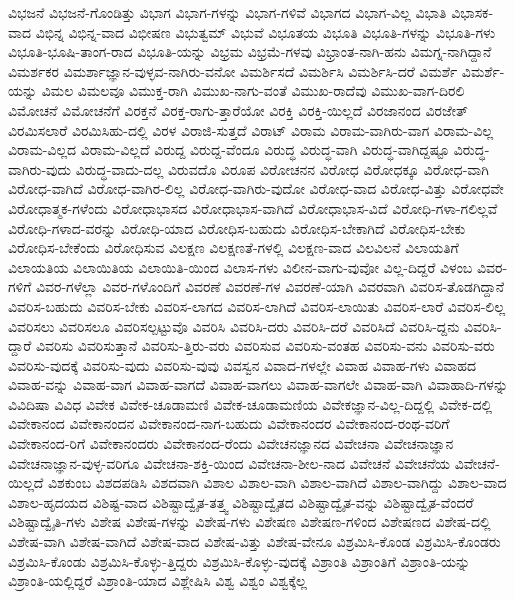 {ವಿಭಜನೆ
ವಿಭಜನೆ-ಗೊಂಡಿತ್ತು
ವಿಭಾಗ
ವಿಭಾಗ-ಗಳನ್ನು
ವಿಭಾಗ-ಗಳಿವೆ
ವಿಭಾಗದ
ವಿಭಾಗ-ವಿಲ್ಲ
ವಿಭಾತಿ
ವಿಭಾಸಕ-ವಾದ
ವಿಭಿನ್ನ
ವಿಭಿನ್ನ-ವಾದ
ವಿಭೀಷಣ
ವಿಭುತ್ವಮ್
ವಿಭುವೆ
ವಿಭೂತಯ
ವಿಭೂತಿ
ವಿಭೂತಿ-ಗಳನ್ನು
ವಿಭೂತಿ-ಗಳು
ವಿಭೂತಿ-ಭೂಷಿ-ತಾಂಗ-ರಾದ
ವಿಭೂತಿ-ಯನ್ನು
ವಿಭ್ರಮ
ವಿಭ್ರಮೆ-ಗಳವು
ವಿಭ್ರಾಂತ-ನಾಗಿ-ಹನು
ವಿಮಗ್ನ-ನಾಗಿದ್ದಾನೆ
ವಿಮರ್ಶಕರ
ವಿಮರ್ಶಾಜ್ಞಾನ-ವುಳ್ಳವ-ನಾಗಿರು-ವನೋ
ವಿಮರ್ಶಿಸದೆ
ವಿಮರ್ಶಿಸಿ
ವಿಮರ್ಶಿಸಿ-ದರೆ
ವಿಮರ್ಶೆ
ವಿಮರ್ಶೆ-ಯನ್ನು
ವಿಮಲ
ವಿಮಲವೂ
ವಿಮುಕ್ತ-ರಾಗಿ
ವಿಮುಖ-ನಾಗು-ವಂತೆ
ವಿಮುಖ-ರಾದೆವು
ವಿಮುಖ-ವಾಗ-ದಿರಲಿ
ವಿಮೋಚನೆ
ವಿಮೋಚನೆಗೆ
ವಿರಕ್ತನೆ
ವಿರಕ್ತ-ರಾಗು-ತ್ತಾರೆಯೋ
ವಿರಕ್ತಿ
ವಿರಕ್ತಿ-ಯಿಲ್ಲದೆ
ವಿರಜಾನಂದ
ವಿರಜೇತ್
ವಿರಮಿಸಲಾರೆ
ವಿರಮಿಸಿಹು-ದಲ್ಲಿ
ವಿರಳ
ವಿರಾಜಿ-ಸುತ್ತದೆ
ವಿರಾಟ್
ವಿರಾಮ
ವಿರಾಮ-ವಾಗಿರು-ವಾಗ
ವಿರಾಮ-ವಿಲ್ಲ
ವಿರಾಮ-ವಿಲ್ಲದ
ವಿರಾಮ-ವಿಲ್ಲದೆ
ವಿರುದ್ದ
ವಿರುದ್ದ-ವೆಂದೂ
ವಿರುದ್ಧ
ವಿರುದ್ಧ-ವಾಗಿ
ವಿರುದ್ಧ-ವಾಗಿದ್ದಷ್ಟೂ
ವಿರುದ್ಧ-ವಾಗಿರು-ವುದು
ವಿರುದ್ಧ-ವಾದು-ದಲ್ಲ
ವಿರುವದೊ
ವಿರೂಪ
ವಿರೋಚನನ
ವಿರೋಧ
ವಿರೋಧಕ್ಕೂ
ವಿರೋಧ-ವಾಗಿ
ವಿರೋಧ-ವಾಗಿದೆ
ವಿರೋಧ-ವಾಗಿರ-ಲಿಲ್ಲ
ವಿರೋಧ-ವಾಗಿರು-ವುದೋ
ವಿರೋಧ-ವಾದ
ವಿರೋಧ-ವಿತ್ತು
ವಿರೋಧವೇ
ವಿರೋಧಾತ್ಮಕ-ಗಳೆಂದು
ವಿರೋಧಾಭಾಸದ
ವಿರೋಧಾಭಾಸ-ವಾಗಿದೆ
ವಿರೋಧಾಭಾಸ-ವಿದೆ
ವಿರೋಧಿ-ಗಳಾ-ಗಲಿಲ್ಲವೆ
ವಿರೋಧಿ-ಗಳಾದ-ವರನ್ನು
ವಿರೋಧಿ-ಯಾದ
ವಿರೋಧಿಸ-ಬಹುದು
ವಿರೋಧಿಸ-ಬೇಕಾಗಿದೆ
ವಿರೋಧಿಸ-ಬೇಕು
ವಿರೋಧಿಸ-ಬೇಕೆಂದು
ವಿರೋಧಿಸುವ
ವಿಲಕ್ಷಣ
ವಿಲಕ್ಷಣತೆ-ಗಳಲ್ಲಿ
ವಿಲಕ್ಷಣ-ವಾದ
ವಿಲವಿಲನೆ
ವಿಲಾಯತಿಗೆ
ವಿಲಾಯತಿಯ
ವಿಲಾಯಿತಿಯ
ವಿಲಾಯಿತಿ-ಯಿಂದ
ವಿಲಾಸ-ಗಳು
ವಿಲೀನ-ವಾಗು-ವುವೋ
ವಿಲ್ಲ-ದಿದ್ದರೆ
ವಿಳಂಬ
ವಿವರ-ಗಳಿಗೆ
ವಿವರ-ಗಳೆಲ್ಲಾ
ವಿವರ-ಗಳೊಂದಿಗೆ
ವಿವರಣೆ
ವಿವರಣೆ-ಗಳ
ವಿವರಣೆ-ಯಾಗಿ
ವಿವರವಾಗಿ
ವಿವರಿಸ-ತೊಡಗಿದ್ದಾನೆ
ವಿವರಿಸ-ಬಹುದು
ವಿವರಿಸ-ಬೇಕು
ವಿವರಿಸ-ಲಾಗದ
ವಿವರಿಸ-ಲಾಗಿದೆ
ವಿವರಿಸ-ಲಾಯಿತು
ವಿವರಿಸ-ಲಾರೆ
ವಿವರಿಸ-ಲಿಲ್ಲ
ವಿವರಿಸಲು
ವಿವರಿಸಲೂ
ವಿವರಿಸಲ್ಪಟ್ಟುವೊ
ವಿವರಿಸಿ
ವಿವರಿಸಿ-ದರು
ವಿವರಿಸಿ-ದರೆ
ವಿವರಿಸಿದೆ
ವಿವರಿಸಿ-ದ್ದನು
ವಿವರಿಸಿ-ದ್ದಾರೆ
ವಿವರಿಸು
ವಿವರಿಸುತ್ತಾನೆ
ವಿವರಿಸು-ತ್ತಿರು-ವರು
ವಿವರಿಸುವ
ವಿವರಿಸು-ವಂತಹ
ವಿವರಿಸು-ವನು
ವಿವರಿಸು-ವರು
ವಿವರಿಸು-ವುದಕ್ಕೆ
ವಿವರಿಸು-ವುದು
ವಿವರಿಸು-ವುವು
ವಿವಸ್ವನ
ವಿವಾದ-ಗಳಲ್ಲೇ
ವಿವಾಹ
ವಿವಾಹ-ಗಳು
ವಿವಾಹದ
ವಿವಾಹ-ವನ್ನು
ವಿವಾಹ-ವಾಗ
ವಿವಾಹ-ವಾಗದೆ
ವಿವಾಹ-ವಾಗಲು
ವಿವಾಹ-ವಾಗಲೇ
ವಿವಾಹ-ವಾಗಿ
ವಿವಾಹಾದಿ-ಗಳನ್ನು
ವಿವಿದಿಷಾ
ವಿವಿಧ
ವಿವೇಕ
ವಿವೇಕ-ಚೂಡಾಮಣಿ
ವಿವೇಕ-ಚೂಡಾಮಣಿಯ
ವಿವೇಕಜ್ಞಾನ-ವಿಲ್ಲ-ದಿದ್ದಲ್ಲಿ
ವಿವೇಕ-ದಲ್ಲಿ
ವಿವೇಕಾನಂದ
ವಿವೇಕಾನಂದನ
ವಿವೇಕಾನಂದ-ನಾಗ-ಬಹುದು
ವಿವೇಕಾನಂದರ
ವಿವೇಕಾನಂದ-ರಂಥ-ವರಿಗೆ
ವಿವೇಕಾನಂದ-ರಿಗೆ
ವಿವೇಕಾನಂದರು
ವಿವೇಕಾನಂದ-ರೆಂದು
ವಿವೇಚನಜ್ಞಾನದ
ವಿವೇಚನಾ
ವಿವೇಚನಾಜ್ಞಾನ
ವಿವೇಚನಾಜ್ಞಾನ-ವುಳ್ಳ-ವರಿಗೂ
ವಿವೇಚನಾ-ಶಕ್ತಿ-ಯಿಂದ
ವಿವೇಚನಾ-ಶೀಲ-ನಾದ
ವಿವೇಚನೆ
ವಿವೇಚನೆಯ
ವಿವೇಚನೆ-ಯಿಲ್ಲದೆ
ವಿಶಕುಂಬ
ವಿಶದಪಡಿಸಿ
ವಿಶದವಾಗಿ
ವಿಶಾಲ
ವಿಶಾಲ-ವಾಗಿ
ವಿಶಾಲ-ವಾಗಿದೆ
ವಿಶಾಲ-ವಾಗಿದ್ದು
ವಿಶಾಲ-ವಾದ
ವಿಶಾಲ-ಹೃದಯದ
ವಿಶಿಷ್ಟ-ವಾದ
ವಿಶಿಷ್ಟಾದ್ವೈತ-ತತ್ತ್ವ
ವಿಶಿಷ್ಟಾದ್ವೈತದ
ವಿಶಿಷ್ಟಾದ್ವೈತ-ವನ್ನು
ವಿಶಿಷ್ಟಾದ್ವೈತ-ವೆಂದರೆ
ವಿಶಿಷ್ಟಾದ್ವೈತಿ-ಗಳು
ವಿಶೇಷ
ವಿಶೇಷ-ಗಳನ್ನು
ವಿಶೇಷ-ಗಳು
ವಿಶೇಷಣ
ವಿಶೇಷಣ-ಗಳಿಂದ
ವಿಶೇಷಣದ
ವಿಶೇಷ-ದಲ್ಲಿ
ವಿಶೇಷ-ವಾಗಿ
ವಿಶೇಷ-ವಾಗಿದೆ
ವಿಶೇಷ-ವಾದ
ವಿಶೇಷ-ವಿತ್ತು
ವಿಶೇಷ-ವೇನೂ
ವಿಶ್ರಮಿಸಿ-ಕೊಂಡ
ವಿಶ್ರಮಿಸಿ-ಕೊಂಡರು
ವಿಶ್ರಮಿಸಿ-ಕೊಂಡು
ವಿಶ್ರಮಿಸಿ-ಕೊಳ್ಳು-ತ್ತಿದ್ದರು
ವಿಶ್ರಮಿಸಿ-ಕೊಳ್ಳು-ವುದಕ್ಕೆ
ವಿಶ್ರಾಂತಿ
ವಿಶ್ರಾಂತಿಗೆ
ವಿಶ್ರಾಂತಿ-ಯನ್ನು
ವಿಶ್ರಾಂತಿ-ಯಲ್ಲಿದ್ದರೆ
ವಿಶ್ರಾಂತಿ-ಯಾದ
ವಿಶ್ಲೇಷಿಸಿ
ವಿಶ್ವ
ವಿಶ್ವಂ
ವಿಶ್ವಕ್ಕೆಲ್ಲ
}

